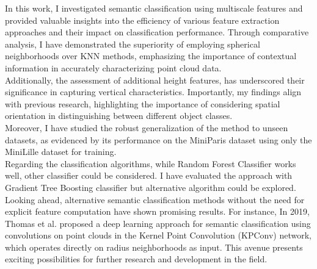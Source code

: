 \documentclass{article}
\begin{document}
In this work, I investigated semantic classification using multiscale features and provided valuable insights into the efficiency of various feature extraction approaches and their impact on classification performance. 
Through comparative analysis, I have demonstrated the superiority of employing spherical neighborhoods over KNN methods, emphasizing the importance of contextual information in accurately characterizing point cloud data. \\ 
Additionally, the assessment of additional height features, has underscored their significance in capturing vertical characteristics. Importantly, my findings align with previous research, highlighting the importance of considering spatial orientation in distinguishing between different object classes. \\ 
Moreover, I have studied the robust generalization of the method to unseen datasets, as evidenced by its performance on the MiniParis dataset using only the MiniLille dataset for training. \\ 
Regarding the classification algorithms, while Random Forest Classifier works well, other classifier could be considered. I have evaluated the approach with Gradient Tree Boosting classifier but alternative algorithm could be explored. \\ 
Looking ahead, alternative semantic classification methods without the need for explicit feature computation have shown promising results. For instance, In 2019, Thomas et al. \cite{thomas_kpconv_2019} proposed a deep learning approach for semantic classification using convolutions on point clouds in the Kernel Point Convolution (KPConv) network, which operates directly on radius neighborhoods as input. This avenue presents exciting possibilities for further research and development in the field.



\end{document}
